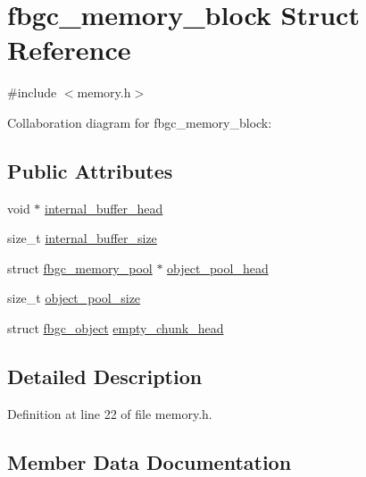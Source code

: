 \hypertarget{structfbgc__memory__block}{}\section{fbgc\+\_\+memory\+\_\+block Struct Reference}
\label{structfbgc__memory__block}


{\ttfamily \#include $<$memory.\+h$>$}



Collaboration diagram for fbgc\+\_\+memory\+\_\+block\+:
\subsection*{Public Attributes}
\begin{DoxyCompactItemize}
\item 
void $\ast$ \hyperlink{structfbgc__memory__block_a23bcb1b2377e1957ef5df979fcc401a6}{internal\+\_\+buffer\+\_\+head}
\item 
size\+\_\+t \hyperlink{structfbgc__memory__block_a05ba224a5693b1eadad31ff08c3d9e93}{internal\+\_\+buffer\+\_\+size}
\item 
struct \hyperlink{structfbgc__memory__pool}{fbgc\+\_\+memory\+\_\+pool} $\ast$ \hyperlink{structfbgc__memory__block_abd719618896317113bd9a247d926e997}{object\+\_\+pool\+\_\+head}
\item 
size\+\_\+t \hyperlink{structfbgc__memory__block_a9e2f095bebf9ee6768bfd741fc481349}{object\+\_\+pool\+\_\+size}
\item 
struct \hyperlink{structfbgc__object}{fbgc\+\_\+object} \hyperlink{structfbgc__memory__block_afd758948464f9e8d5d247ca4eeccfef8}{empty\+\_\+chunk\+\_\+head}
\end{DoxyCompactItemize}


\subsection{Detailed Description}


Definition at line 22 of file memory.\+h.



\subsection{Member Data Documentation}
\mbox{\label{structfbgc__memory__block_afd758948464f9e8d5d247ca4eeccfef8}} 

